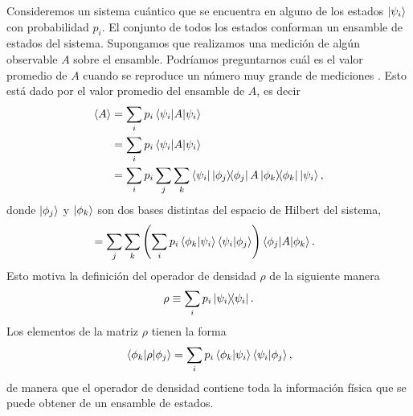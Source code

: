 Consideremos un sistema cuántico que se encuentra en alguno de los estados 
$\ket{\psi_{i} }$ con probabilidad $p_i$. El conjunto de todos los estados
conforman un ensamble de estados del sistema. Supongamos que realizamos 
una medición de algún observable $A$ sobre el ensamble. Podríamos 
preguntarnos cuál es el valor promedio de $A$ cuando se 
reproduce un número muy grande de mediciones \cite{sakurai2010modern}. 
Esto está dado por el valor promedio del ensamble de $A$, es decir
\begin{align}
	\expval{A} &= \sum_i p_i \matrixel{\psii}{A}{\psii} \\
	&= \sum_i p_i \matrixel{\psii}{A}{\psii} \\
	&= \sum_ip_i \sum _j\sum _k
	\bra{\psii}\dyad{\phi_j}{\phi_j}A\dyad{\phi_k}{\phi_k}\Pk{i},
\end{align}
donde $\ket{\phi_j}$ y $\ket{\phi_k}$ son dos bases distintas del
espacio de Hilbert del sistema,
\begin{align}
	&= \sum _j\sum _k \qty(\sum_ip_i \braket{\phi_k}{\psii}
	\braket{\psii}{\phi_j})	\matrixel{\phi_j}{A}{\phi_k}.
\end{align}
Esto motiva la definición del operador de densidad $\rho$ 
de la siguiente manera
\begin{equation}
	\rho \equiv \sum _i p_i\dyad{\psi_i}{\psi_i}.
	\label{eq:rho_def}
\end{equation}
Los elementos de la matriz $\rho$ tienen la forma 
\begin{align}
	\matrixel{\phi_k}{\rho}{\phi_j} = 
	\sum_ip_i \braket{\phi_k}{\psii}\braket{\psii}{\phi_j},
\end{align}
de manera que el operador de densidad contiene toda la información 
física que se puede obtener de un ensamble de estados.

